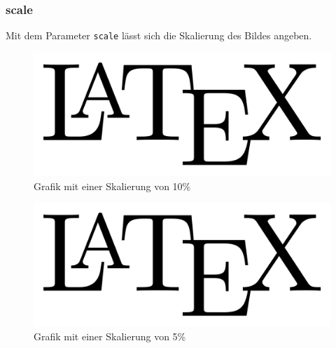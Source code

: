 \documentclass[
12pt,
ngerman
]{scrreprt}
\begin{document}
\subsubsection{scale}
\label{subsubsec:graphics-param-scale}
Mit dem Parameter \verb!scale! lässt sich die Skalierung des Bildes angeben.
\begin{figure} [hbt!]
  \centering
  \includegraphics[scale=0.1]{img/latex-logo}
  \caption{Grafik mit einer Skalierung von 10\%}
  \label{fig:graphics-param-scale-1}
\end{figure}
\begin{figure} [hbt!]
  \centering
  \includegraphics[scale=0.05]{img/latex-logo}
  \caption{Grafik mit einer Skalierung von 5\%}
  \label{fig:graphics-param-scale-2}
\end{figure}

\newpage
\end{document}
